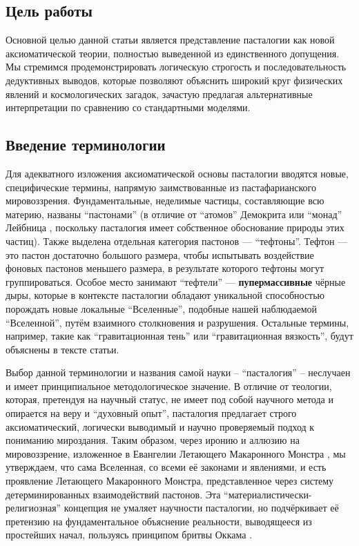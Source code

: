 \documentclass[pdflatex,sn-mathphys-num,referee]{sn-jnl}
\begin{document}
\subsection{Цель работы}\label{subsec:purpose}

Основной целью данной статьи является представление пасталогии как новой аксиоматической теории, полностью выведенной из единственного допущения. Мы стремимся продемонстрировать логическую строгость и последовательность дедуктивных выводов, которые позволяют объяснить широкий круг физических явлений и космологических загадок, зачастую предлагая альтернативные интерпретации по сравнению со стандартными моделями.

\subsection{Введение терминологии}\label{subsec:terminology}

Для адекватного изложения аксиоматической основы пасталогии вводятся новые, специфические термины, напрямую заимствованные из пастафарианского мировоззрения. Фундаментальные, неделимые частицы, составляющие всю материю, названы ``пастонами'' (в отличие от ``атомов'' Демокрита \cite{kirk1983-democritus} или ``монад'' Лейбница \cite{leibniz1989-monadology}, поскольку пасталогия имеет собственное обоснование природы этих частиц). Также выделена отдельная категория пастонов --- ``тефтоны''. Тефтон --- это пастон достаточно большого размера, чтобы испытывать воздействие фоновых пастонов меньшего размера, в результате которого тефтоны могут группироваться. Особое место занимают ``тефтели'' --- \textbf{пупермассивные} чёрные дыры, которые в контексте пасталогии обладают уникальной способностью порождать новые локальные ``Вселенные'', подобные нашей наблюдаемой ``Вселенной'', путём взаимного столкновения и разрушения. Остальные термины, например, такие как ``гравитационная тень'' или ``гравитационная вязкость'', будут объяснены в тексте статьи.

Выбор данной терминологии и названия самой науки -- ``пасталогия'' -- неслучаен и имеет принципиальное методологическое значение. В отличие от теологии, которая, претендуя на научный статус, не имеет под собой научного метода и опирается на веру и ``духовный опыт'', пасталогия предлагает строго аксиоматический, логически выводимый и научно проверяемый подход к пониманию мироздания. Таким образом, через иронию и аллюзию на мировоззрение, изложенное в Евангелии Летающего Макаронного Монстра \cite{henderson2006}, мы утверждаем, что сама Вселенная, со всеми её законами и явлениями, и есть проявление Летающего Макаронного Монстра, представленное через систему детерминированных взаимодействий пастонов. Эта ``материалистически-религиозная'' концепция не умаляет научности пасталогии, но подчёркивает её претензию на фундаментальное объяснение реальности, выводящееся из простейших начал, пользуясь принципом бритвы Оккама \cite{ockham-razor-sep}.
\end{document}
